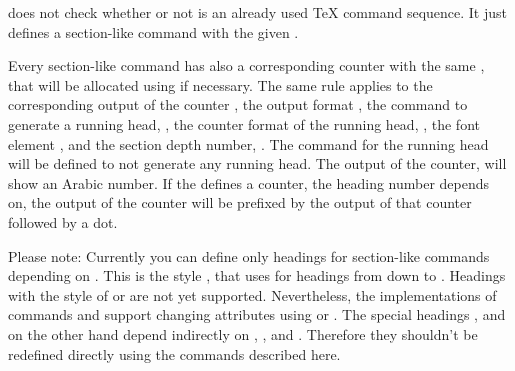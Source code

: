  does not check whether or not  is
an already used \TeX{} command sequence. It just defines a section-like
command  with the given .

Every section-like command has also a corresponding counter with the same
, that will be allocated using  if
necessary. The same rule applies to the corresponding output of the counter
, the output format , the
command to generate a running head, , the counter
format of the running head, , the font element
, and the section depth number,
. The command for the running head
 will be defined to not generate any running head. The
output of the counter,  will show an Arabic number. If
the   defines a counter, the heading number
depends on, the output of the counter will be prefixed by the output of that
counter followed by a dot.

Please note: Currently you can define only headings for
section-like commands depending on . This is the style
, that \KOMAScript{} uses for headings from 
down to . Headings with the style of  or
 are not yet supported. Nevertheless, the implementations of
commands  and  support changing attributes using
 or . The
special headings ,  and  on the
other hand depend indirectly on , , and
. Therefore they shouldn't be redefined directly using the
commands described here.

